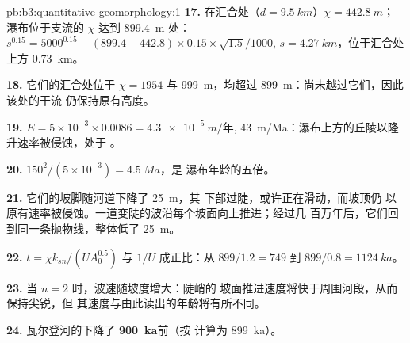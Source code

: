 \begin{solution}{pb:b3:quantitative-geomorphology:1}
\textbf{17.} 在汇合处（$d = \qty{9.5}{km}$）$\chi = \qty{442.8}{m}$；
瀑布位于支流的 $\chi$ 达到 \qty{899.4}{m} 处：
$s^{0.15} = 5000^{0.15} - (899.4 - 442.8)\times0.15\times\sqrt{1.5}/1000$,
$s = \qty{4.27}{km}$，位于汇合处上方 \qty{0.73}{km}。

\textbf{18.} 它们的汇合处位于 $\chi = 1954$ 与 \qty{999}{m}，均超过
\qty{899}{m}：尚未越过它们，因此该处的干流
仍保持原有高度。

\textbf{19.} $E = 5\times10^{-3}\times0.0086 = \qty{4.3e-5}{m/\text{年}}$,
\qty{43}{m/Ma}：瀑布上方的丘陵以隆升速率被侵蚀，处于
。

\textbf{20.} $150^2/(5\times10^{-3}) = \qty{4.5}{Ma}$，是
瀑布年龄的五倍。

\textbf{21.} 它们的坡脚随河道下降了 \qty{25}{m}，其
下部过陡，或许正在滑动，而坡顶仍
以原有速率被侵蚀。一道变陡的波沿每个坡面向上推进；经过几
百万年后，它们回到同一条抛物线，整体低了 \qty{25}{m}。

\textbf{22.} $t = \chi k_{sn}/(U A_0^{0.5})$ 与 $1/U$ 成正比：从
$899/1.2 = 749$ 到 $899/0.8 = \qty{1124}{ka}$。

\textbf{23.} 当 $n = 2$ 时，波速随坡度增大：陡峭的
坡面推进速度将快于周围河段，从而保持尖锐，但
其速度与由此读出的年龄将有所不同。

\textbf{24.} 瓦尔登河的下降了
\textbf{\qty[text-series-to-math=true]{900}{ka}}前（按
计算为 \qty{899}{ka}）。
\end{solution}
